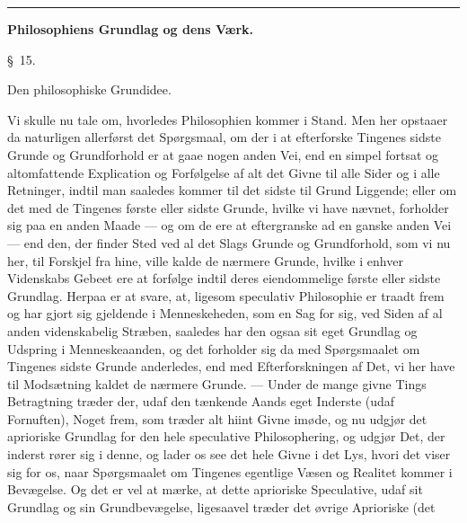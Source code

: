 \documentclass[12pt,a4paper]{book}
\newcommand{\grouphead}[1]{%
  \bigskip\begin{center}\large\textbf{#1}\end{center}\smallskip}
\newcommand{\apage}[1]{\marginnote{\footnotesize\textit{[#1]}}}
\begin{document}
\begin{center}\rule{0.18\linewidth}{0.4pt}\end{center}

\grouphead{Philosophiens Grundlag og dens Værk.} \apage{59} 

\begin{center}\large\S~15.\end{center}
\begin{center}Den philosophiske Grundidee.\end{center}

Vi skulle nu tale om, hvorledes Philosophien kommer i Stand. Men her opstaaer da
naturligen allerførst det Spørgsmaal, om der i at efterforske Tingenes sidste Grunde
og Grundforhold er at gaae nogen anden Vei, end en simpel fortsat og altomfattende
Explication og Forfølgelse af alt det Givne til alle Sider og i alle Retninger,
indtil man saaledes kommer til det sidste til Grund Liggende; eller om det med de
Tingenes første eller sidste Grunde, hvilke vi have nævnet, forholder sig paa en
anden Maade --- og om de ere at eftergranske ad en ganske anden Vei --- end den, der
finder Sted ved al det Slags Grunde og Grundforhold, som vi nu her, til Forskjel fra
hine, ville kalde de nærmere Grunde, hvilke i enhver Videnskabs Gebeet ere at
forfølge indtil deres eiendommelige første eller sidste Grundlag. Herpaa er at
svare, at, ligesom speculativ Philosophie er traadt frem og har gjort sig gjeldende
i Menneskeheden, som en Sag for sig, ved Siden af al anden videnskabelig Stræben,
saaledes har den ogsaa sit eget Grundlag og Udspring i Menneskeaanden, og det
forholder sig da med Spørgsmaalet om Tingenes sidste Grunde anderledes, end med
Efterforskningen af Det, vi her have til Modsætning kaldet de nærmere Grunde. ---
Under de mange givne Tings Betragtning træder der, udaf den tænkende Aands eget \apage{60} 
Inderste (udaf Fornuften), Noget frem, som træder alt hiint Givne imøde, og nu
udgjør det aprioriske Grundlag for den hele speculative Philosophering, og udgjør
Det, der inderst rører sig i denne, og lader os see det hele Givne i det Lys, hvori
det viser sig for os, naar Spørgsmaalet om Tingenes egentlige Væsen og Realitet
kommer i Bevægelse. Og det er vel at mærke, at dette aprioriske Speculative, udaf
sit Grundlag og sin Grundbevægelse, ligesaavel træder det øvrige Aprioriske (det
\end{document}
